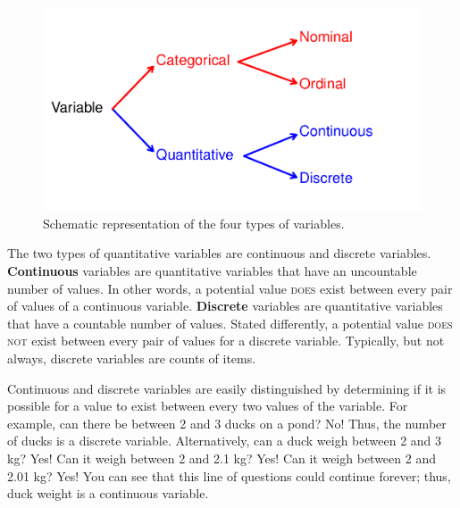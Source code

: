 \documentclass[10pt,openany]{book}\usepackage[]{graphicx}\usepackage[]{color}
\newenvironment{knitrout}{}{} %
\begin{document}
\begin{knitrout}
\color{fgcolor}\begin{figure}[hbtp]

{\centering \includegraphics[width=.5\linewidth]{Figs/VarTypes-1} 

}

\caption[Schematic representation of the four types of variables]{Schematic representation of the four types of variables.}\label{fig:VarTypes}
\end{figure}


\end{knitrout}
\vspace{9pt} %

The two types of quantitative variables are continuous and discrete variables. \textbf{Continuous} variables are quantitative variables that have an uncountable number of values.  In other words, a potential value \textsc{does} exist between every pair of values of a continuous variable. \textbf{Discrete} variables are quantitative variables that have a countable number of values.  Stated differently, a potential value \textsc{does not} exist between every pair of values for a discrete variable. Typically, but not always, discrete variables are counts of items.

Continuous and discrete variables are easily distinguished by determining if it is possible for a value to exist between every two values of the variable. For example, can there be between 2 and 3 ducks on a pond?  No!  Thus, the number of ducks is a discrete variable. Alternatively, can a duck weigh between 2 and 3 kg?  Yes!  Can it weigh between 2 and 2.1 kg?  Yes!  Can it weigh between 2 and 2.01 kg?  Yes!  You can see that this line of questions could continue forever; thus, duck weight is a continuous variable.


\end{document}
